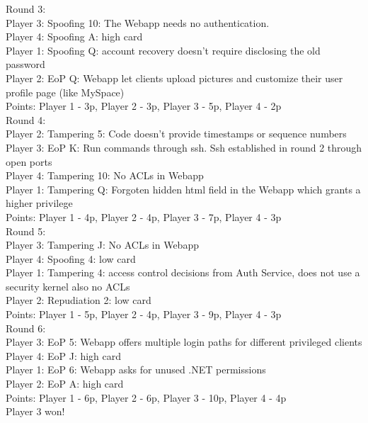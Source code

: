 Round 3:  \\
Player 3: Spoofing 10: The Webapp needs no authentication. \\
Player 4: Spoofing A: high card \\
Player 1: Spoofing Q: account recovery doesn’t require disclosing the old password \\
Player 2: EoP Q: Webapp let clients upload pictures and customize their user profile page (like MySpace)\\
Points: Player 1 - 3p, Player 2 - 3p, Player 3 - 5p, Player 4 - 2p\\

Round 4:  \\
Player 2: Tampering 5: Code doesn’t provide timestamps or sequence numbers\\
Player 3: EoP K: Run commands through ssh. Ssh established in round 2 through open ports \\
Player 4: Tampering 10: No ACLs in Webapp\\
Player 1: Tampering Q: Forgoten hidden html field in the Webapp which grants a higher privilege \\
Points: Player 1 - 4p, Player 2 - 4p, Player 3 - 7p, Player 4 - 3p\\

Round 5:  \\
Player 3: Tampering J: No ACLs in Webapp\\
Player 4: Spoofing 4: low card \\
Player 1: Tampering 4: access control decisions from Auth Service, does not use a security kernel also no ACLs \\
Player 2: Repudiation 2: low card\\
Points: Player 1 - 5p, Player 2 - 4p, Player 3 - 9p, Player 4 - 3p\\

Round 6:  \\
Player 3: EoP 5: Webapp offers multiple login paths for different privileged clients \\
Player 4: EoP J: high card \\
Player 1: EoP 6: Webapp asks for unused .NET permissions \\
Player 2: EoP A: high card\\
Points: Player 1 - 6p, Player 2 - 6p, Player 3 - 10p, Player 4 - 4p\\

Player 3 won!






